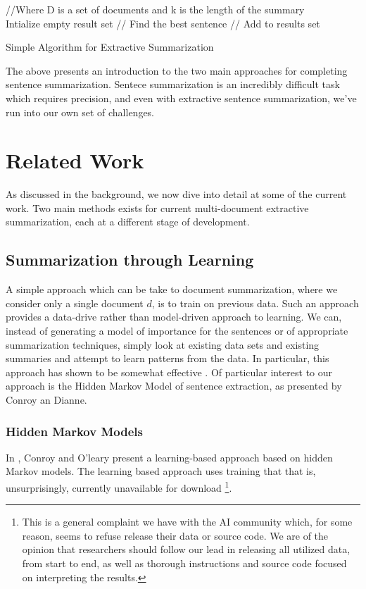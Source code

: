 \documentclass[11pt]{article}
\begin{document}
\begin{algorithm}
  \begin{algorithmic}
     //Where D is a set of documents and k is the length of the summary
     \\ Intialize empty result set
       // Find the best sentence
         // Add to results set
    \EndWhile
    \EndProcedure{}
  \end{algorithmic}
  \caption{Simple Algorithm for Extractive Summarization}
\end{algorithm}

The above presents an introduction to the two main approaches for completing sentence summarization. Sentece summarization is an incredibly difficult task which requires precision, and even with extractive sentence summarization, we've run into our own set of challenges.

\section{Related Work}
As discussed in the background, we now dive into detail at some of the current work. Two main methods exists for current multi-document extractive summarization, each at a different stage of development.

\subsection{Summarization through Learning}
A simple approach which can be take to document summarization, where we consider only a single document $d$, is to train on previous data. Such an approach provides  a data-drive rather than model-driven approach to learning. We can, instead of generating a model of importance for the sentences or of appropriate summarization techniques, simply look at existing data sets and existing summaries and attempt to learn patterns from the data. In particular, this approach has shown to be somewhat effective \cite{survey}. Of particular interest to our approach is the Hidden Markov Model of sentence extraction, as presented by Conroy an Dianne.

\subsubsection{Hidden Markov Models}
In \cite{hmm_summary}, Conroy and O'leary present a learning-based approach based on hidden Markov models. The learning based approach uses training that that is, unsurprisingly, currently unavailable for download \footnote{This is a general complaint we have with the AI community which, for some reason, seems to refuse release their data or source code. We are of the opinion that researchers should follow our lead in releasing all utilized data, from start to end, as well as thorough instructions and source code focused on interpreting the results.}. \\
\end{document}

